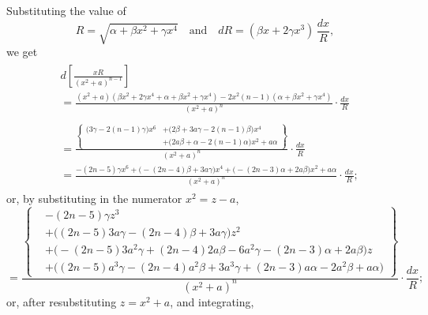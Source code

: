 \documentclass[12pt,leqno]{book}[2005/09/16]
\newcommand{\DPnote}[1]{}
\newcommand{\Pagelabel}[1]
  {\phantomsection\label{page:#1}}
\begin{document}
Substituting the value of
\[
R  = \sqrt{\alpha + \beta x^{2} + \gamma x^{4}}\quad\text{and}\quad
dR = (\beta x + 2 \gamma x^{3})\, \frac{dx}{R},
\]
we get
\Pagelabel{12}%
\begin{gather*}
\begin{aligned}
&d\left[\frac{xR}{(x^{2} + a)^{n-1}}\right] \\ %
%
&= \frac{(x^{2} + a)(\beta x^{2} + 2 \gamma x^{4} + \alpha + \beta x^{2} + \gamma x^{4})
      - 2x^{2}(n-1)(\alpha + \beta x^{2} + \gamma x^{4})}
     {(x^{2} + a)^{n}} · \frac{dx}{R}
\end{aligned} \\
%
\begin{aligned}
&= \frac{\left\{\begin{aligned}
        \bigl(3\gamma - 2(n-1)\gamma\bigr) x^6
      &+ \bigl(2\beta + 3a\gamma - 2(n-1)\beta\bigr) x^4 \\
      &+ \bigl(2a\beta + \alpha - 2(n-1)\alpha\bigr) x^2
       + a\alpha\end{aligned}\right\}}
  {(x^{2} + a)^{n}} · \frac{dx}{R} \\
%
&= \frac{-(2n - 5)\gamma x^6
      + \bigl(\DPnote{[**A]} - (2n - 4)\beta + 3a\gamma\bigr) x^4
      + \bigl(\DPnote{[**B]} - (2n - 3)\alpha + \DPnote{[**C]} 2a\beta\bigr) x^2
      + a\alpha}
  {(x^{2} + a)^{n}} · \frac{dx}{R};
\end{aligned}
\end{gather*}
or, by substituting in the numerator $x^{2} = z - a$,
\[
= \frac{\left\{\begin{aligned}&- (2n - 5)\gamma z^3 \\
        &+ \bigl((2n - 5) 3a\gamma - (2n - 4)\beta + 3a\gamma\bigr) z^2 \\
        &+ \bigl(\DPnote{[**D]} - (2n - 5) 3a^2\gamma + (2n - 4) 2a\beta - 6a^2\gamma
                - (2n - 3)\alpha + 2a\beta\bigr) z \\
        &+ \bigl((2n - 5)a^3\gamma - (2n - 4) a^2\beta + 3a^3\gamma
                + (2n - 3)a\alpha - 2a^2\beta + a\alpha\bigr)\end{aligned}\right\}}{(x^{2} + a)^{n}} · \frac{dx}{R};
\]
or, after resubstituting $z = x^2 + a$, and integrating,
\end{document}
